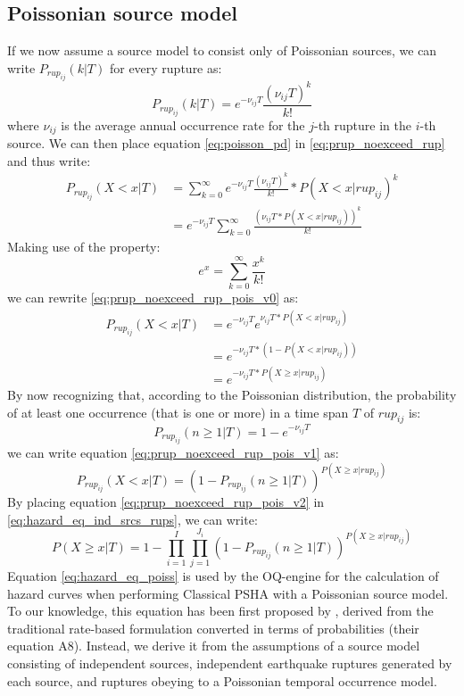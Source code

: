 \subsection{Poissonian source model}
If we now assume a source model to consist only of Poissonian sources, we can write $P_{rup_{ij}}(k | T)$ for every rupture as:
\begin{equation}
\label{eq:poisson_pd}
P_{rup_{ij}}(k | T) = e^{-\nu_{ij} T} \frac{(\nu_{ij} T) ^ {k}}{k!}
\end{equation}
where $\nu_{ij}$ is the average annual occurrence rate for the $j$-th rupture in the $i$-th source. We can then place equation \ref{eq:poisson_pd} in \ref{eq:prup_noexceed_rup} and thus write:
\begin{align}
\label{eq:prup_noexceed_rup_pois_v0}
P_{rup_{ij}}(X < x | T) & = \sum_{k=0}^{\infty} e^{-\nu_{ij} T} \frac{(\nu_{ij} T) ^ {k}}{k!} * P(X < x | rup_{ij}) ^ {k} \nonumber \\
				 & =  e^{-\nu_{ij} T} \sum_{k=0}^{\infty} \frac{(\nu_{ij} T * P(X < x | rup_{ij})) ^ {k}}{k!}
\end{align}
Making use of the property:
\begin{equation}
e^{x} = \sum_{k=0} ^ {\infty} \frac{x^{k}}{k!}
\end{equation}
we can rewrite \ref{eq:prup_noexceed_rup_pois_v0} as:
\begin{align}
\label{eq:prup_noexceed_rup_pois_v1}
P_{rup_{ij}}(X < x | T) & = e^{-\nu_{ij} T} e ^ {\nu_{ij} T * P(X < x | rup_{ij})} \nonumber \\
				 & = e^{-\nu_{ij} T * (1 - P(X < x | rup_{ij}))} \nonumber \\
				 & = e^{-\nu_{ij} T * P(X \ge x | rup_{ij})}
\end{align}
By now recognizing that, according to the Poissonian distribution, the probability of at least one occurrence
(that is one or more) in a time span $T$ of $rup_{ij}$ is:
\begin{equation}
P_{rup_{ij}}(n \ge 1 | T) = 1 -  e^{-\nu_{ij} T}
\end{equation}
we can write equation \ref{eq:prup_noexceed_rup_pois_v1} as:
\begin{equation}
\label{eq:prup_noexceed_rup_pois_v2}
P_{rup_{ij}}(X < x | T) = (1 - P_{rup_{ij}}(n \ge 1 | T))^{P(X \ge x | rup_{ij})}
\end{equation}
By placing equation \ref{eq:prup_noexceed_rup_pois_v2} in \ref{eq:hazard_eq_ind_srcs_rups}, we can
write:
\begin{equation}
\label{eq:hazard_eq_poiss}
P(X \ge x | T) =  1 - \prod_{i=1}^{I} \prod_{j=1}^{J_{i}} (1 - P_{rup_{ij}}(n \ge 1 | T))^{P(X \ge x | rup_{ij})}
\end{equation}
Equation \ref{eq:hazard_eq_poiss} is used by the OQ-engine for the calculation of hazard curves when performing
Classical PSHA with a Poissonian source model. To our knowledge, this equation has been first proposed by \citet{field2003},
derived from the traditional rate-based formulation converted in terms of probabilities (their equation A8).
Instead, we derive it from the assumptions of a source model consisting of independent sources, independent
earthquake ruptures generated by each source, and ruptures obeying to a Poissonian temporal occurrence model.

